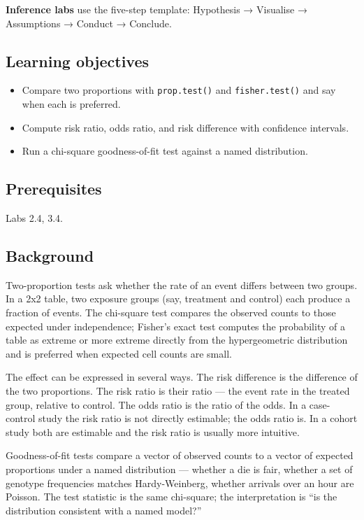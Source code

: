 \documentclass[
]{article}
\author{}
\date{\vspace{-2.5em}}
\providecommand{\tightlist}{%
  \setlength{\itemsep}{0pt}\setlength{\parskip}{0pt}}
\begin{document}
\textbf{Inference labs} use the five-step template: Hypothesis →
Visualise → Assumptions → Conduct → Conclude.

\subsection{Learning objectives}\label{learning-objectives}

\begin{itemize}
\tightlist
\item
  Compare two proportions with \texttt{prop.test()} and
  \texttt{fisher.test()} and say when each is preferred.
\item
  Compute risk ratio, odds ratio, and risk difference with confidence
  intervals.
\item
  Run a chi-square goodness-of-fit test against a named distribution.
\end{itemize}

\subsection{Prerequisites}\label{prerequisites}

Labs 2.4, 3.4.

\subsection{Background}\label{background}

Two-proportion tests ask whether the rate of an event differs between
two groups. In a 2x2 table, two exposure groups (say, treatment and
control) each produce a fraction of events. The chi-square test compares
the observed counts to those expected under independence; Fisher's exact
test computes the probability of a table as extreme or more extreme
directly from the hypergeometric distribution and is preferred when
expected cell counts are small.

The effect can be expressed in several ways. The risk difference is the
difference of the two proportions. The risk ratio is their ratio --- the
event rate in the treated group, relative to control. The odds ratio is
the ratio of the odds. In a case-control study the risk ratio is not
directly estimable; the odds ratio is. In a cohort study both are
estimable and the risk ratio is usually more intuitive.

Goodness-of-fit tests compare a vector of observed counts to a vector of
expected proportions under a named distribution --- whether a die is
fair, whether a set of genotype frequencies matches Hardy-Weinberg,
whether arrivals over an hour are Poisson. The test statistic is the
same chi-square; the interpretation is ``is the distribution consistent
with a named model?''
\end{document}
